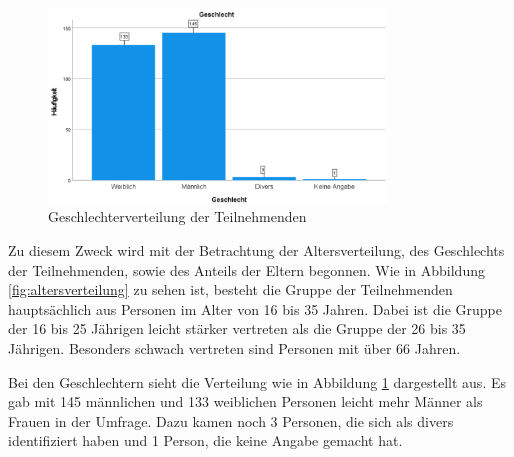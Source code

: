 \begin{figure}[h]
    \centering
    \includegraphics[width=0.8\textwidth]{04_Artefakte/01_Abbildungen/deskriptiv_geschlecht.png}
    \caption{Geschlechterverteilung der Teilnehmenden}
    \label{fig:geschlechterverteilung}
\end{figure}

Zu diesem Zweck wird mit der Betrachtung der Altersverteilung, des Geschlechts der Teilnehmenden, 
sowie des Anteils der Eltern begonnen. Wie in Abbildung \ref{fig:altersverteilung} zu sehen ist, 
besteht die Gruppe der Teilnehmenden hauptsächlich aus Personen im Alter von 16 bis 35 Jahren.
Dabei ist die Gruppe der 16 bis 25 Jährigen leicht stärker vertreten als die Gruppe der 26 bis 
35 Jährigen. Besonders schwach vertreten sind Personen mit über 66 Jahren.

Bei den Geschlechtern sieht die Verteilung wie in Abbildung \ref{fig:geschlechterverteilung} dargestellt aus. 
Es gab mit 145 männlichen und 133 weiblichen Personen leicht mehr Männer als Frauen in der Umfrage. Dazu kamen 
noch 3 Personen, die sich als divers identifiziert haben und 1 Person, die keine Angabe gemacht hat.

